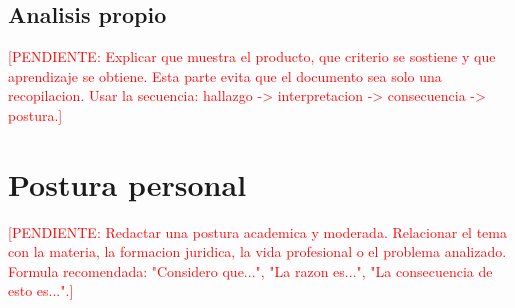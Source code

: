 \documentclass[
	spanish,
	letterpaper, oneside
]{article}
\newcommand{\pendiente}[1]{\textcolor{red}{[PENDIENTE: #1]}}
\begin{document}
%

\subsection{Analisis propio}

\pendiente{Explicar que muestra el producto, que criterio se sostiene y que aprendizaje se obtiene. Esta parte evita que el documento sea solo una recopilacion. Usar la secuencia: hallazgo -> interpretacion -> consecuencia -> postura.}

\section{Postura personal}

\pendiente{Redactar una postura academica y moderada. Relacionar el tema con la materia, la formacion juridica, la vida profesional o el problema analizado. Formula recomendada: "Considero que...", "La razon es...", "La consecuencia de esto es...".}

\end{document}
